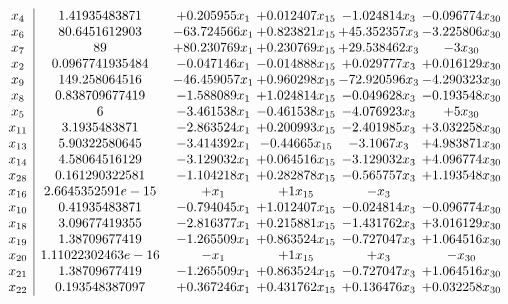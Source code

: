 \documentclass[11pt]{article}
\begin{document}
\[\begin{array}{c| c c@{\hskip 2pt} c@{\hskip 2pt} c@{\hskip 2pt} c@{\hskip 2pt} }
 x_{4}   &  1.41935483871 & + 0.205955 x_{1} & + 0.012407 x_{15} & -1.024814 x_{3} & -0.096774 x_{30}\\
 x_{6}   &  80.6451612903 & -63.724566 x_{1} & + 0.823821 x_{15} & + 45.352357 x_{3} & -3.225806 x_{30}\\
 x_{7}   &  89 & + 80.230769 x_{1} & + 0.230769 x_{15} & + 29.538462 x_{3} & -3 x_{30}\\
 x_{2}   &  0.0967741935484 & -0.047146 x_{1} & -0.014888 x_{15} & + 0.029777 x_{3} & + 0.016129 x_{30}\\
 x_{9}   &  149.258064516 & -46.459057 x_{1} & + 0.960298 x_{15} & -72.920596 x_{3} & -4.290323 x_{30}\\
 x_{8}   &  0.838709677419 & -1.588089 x_{1} & + 1.024814 x_{15} & -0.049628 x_{3} & -0.193548 x_{30}\\
 x_{5}   &  6 & -3.461538 x_{1} & -0.461538 x_{15} & -4.076923 x_{3} & + 5 x_{30}\\
 x_{11}   &  3.1935483871 & -2.863524 x_{1} & + 0.200993 x_{15} & -2.401985 x_{3} & + 3.032258 x_{30}\\
 x_{13}   &  5.90322580645 & -3.414392 x_{1} & -0.44665 x_{15} & -3.1067 x_{3} & + 4.983871 x_{30}\\
 x_{14}   &  4.58064516129 & -3.129032 x_{1} & + 0.064516 x_{15} & -3.129032 x_{3} & + 4.096774 x_{30}\\
 x_{28}   &  0.161290322581 & -1.104218 x_{1} & + 0.282878 x_{15} & -0.565757 x_{3} & + 1.193548 x_{30}\\
 x_{16}   &  2.6645352591e-15 & +  x_{1} & + 1 x_{15} & - x_{3} &   \\
 x_{10}   &  0.41935483871 & -0.794045 x_{1} & + 1.012407 x_{15} & -0.024814 x_{3} & -0.096774 x_{30}\\
 x_{18}   &  3.09677419355 & -2.816377 x_{1} & + 0.215881 x_{15} & -1.431762 x_{3} & + 3.016129 x_{30}\\
 x_{19}   &  1.38709677419 & -1.265509 x_{1} & + 0.863524 x_{15} & -0.727047 x_{3} & + 1.064516 x_{30}\\
 x_{20}   &  1.11022302463e-16 & - x_{1} & + 1 x_{15} & +  x_{3} & - x_{30}\\
 x_{21}   &  1.38709677419 & -1.265509 x_{1} & + 0.863524 x_{15} & -0.727047 x_{3} & + 1.064516 x_{30}\\
 x_{22}   &  0.193548387097 & + 0.367246 x_{1} & + 0.431762 x_{15} & + 0.136476 x_{3} & + 0.032258 x_{30}\\

\end{array}\]
\end{document}
